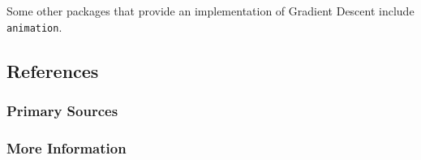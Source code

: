 Some other packages that provide an implementation of Gradient Descent include \texttt{animation}.




\subsection{References}

\subsubsection{Primary Sources}


\subsubsection{More Information}




